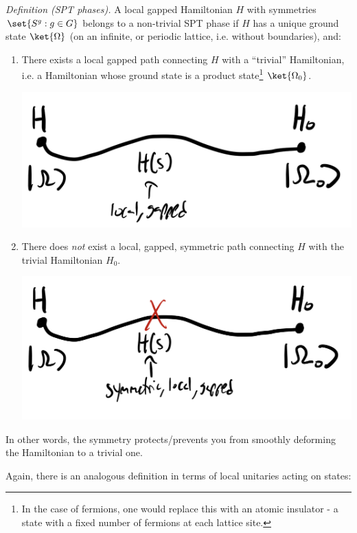 \textit{Definition (SPT phases).} A local gapped Hamiltonian $H$ with symmetries $\set{S^g: g \in G}$ belongs to a non-trivial SPT phase if $H$ has a unique ground state $\ket{\Omega}$ (on an infinite, or periodic lattice, i.e. without boundaries), and:
\begin{enumerate}
    \item There exists a local gapped path connecting $H$ with a ``trivial'' Hamiltonian, i.e. a Hamiltonian whose ground state is a product state\footnote{In the case of fermions, one would replace this with an atomic insulator - a state with a fixed number of fermions at each lattice site.} $\ket{\Omega_0}$.
    \begin{center}
        \includegraphics[scale=0.35]{Lectures/Images/lec13-path.png}
    \end{center}
    \item There does \emph{not} exist a local, gapped, symmetric path connecting $H$ with the trivial Hamiltonian $H_0$.
    \begin{center}
        \includegraphics[scale=0.35]{Lectures/Images/lec13-nosympath.png}
    \end{center}
\end{enumerate}
In other words, the symmetry protects/prevents you from smoothly deforming the Hamiltonian to a trivial one.

Again, there is an analogous definition in terms of local unitaries acting on states:


